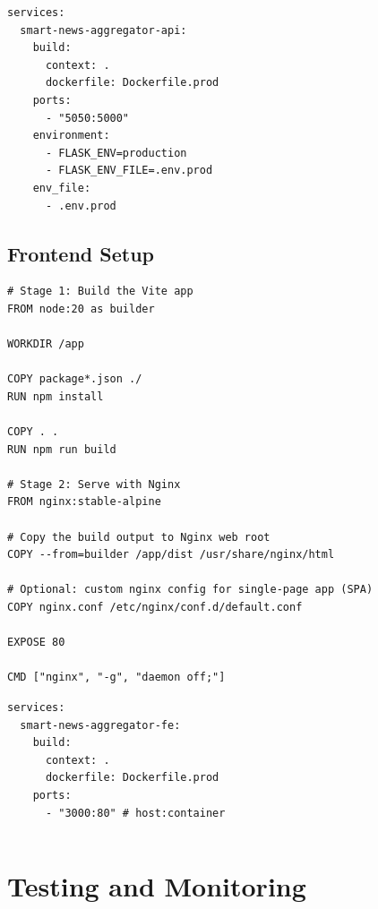 \begin{lstlisting}[style=bashstyle,label={lst:docker-compose-backend},caption={Docker Compose Backend (docker-compose.yml)}]
services:
  smart-news-aggregator-api:
    build:
      context: .
      dockerfile: Dockerfile.prod
    ports:
      - "5050:5000"
    environment:
      - FLASK_ENV=production
      - FLASK_ENV_FILE=.env.prod
    env_file:
      - .env.prod
\end{lstlisting}


\subsection{Frontend Setup}\label{subsec:frontend-setup}

\begin{lstlisting}[style=bashstyle,label={lst:dockerfile-frontend},caption={Dockerfile Frontend (Production configuration)}]
# Stage 1: Build the Vite app
FROM node:20 as builder

WORKDIR /app

COPY package*.json ./
RUN npm install

COPY . .
RUN npm run build

# Stage 2: Serve with Nginx
FROM nginx:stable-alpine

# Copy the build output to Nginx web root
COPY --from=builder /app/dist /usr/share/nginx/html

# Optional: custom nginx config for single-page app (SPA)
COPY nginx.conf /etc/nginx/conf.d/default.conf

EXPOSE 80

CMD ["nginx", "-g", "daemon off;"]
\end{lstlisting}


\begin{lstlisting}[style=bashstyle,label={lst:docker-compose-frontend},caption={Docker Compose Frontend (docker-compose.yml)}]
services:
  smart-news-aggregator-fe:
    build:
      context: .
      dockerfile: Dockerfile.prod
    ports:
      - "3000:80" # host:container
\end{lstlisting}


\begin{lstlisting}[style=bashstyle,label={lst:},caption={ (.yml)}]

\end{lstlisting}


\section{Testing and Monitoring}\label{sec:testing-and-monitoring}


